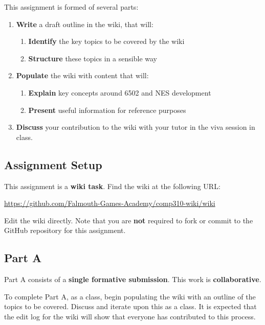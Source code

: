 \documentclass{../../fal_assignment}
\begin{document}
This assignment is formed of several parts:

\begin{enumerate}[label=(\Alph*)]
    \item \textbf{Write} a draft outline in the wiki, that will:
    	\begin{enumerate}[label=(\roman*)]
    		\item \textbf{Identify} the key topics to be covered by the wiki
    		\item \textbf{Structure} these topics in a sensible way
    	\end{enumerate}
    \item \textbf{Populate} the wiki with content that will:
    	\begin{enumerate}[label=(\roman*)]
    		\item \textbf{Explain} key concepts around 6502 and NES development
    		\item \textbf{Present} useful information for reference purposes
    	\end{enumerate}
    \item \textbf{Discuss} your contribution to the wiki with your tutor in the viva session in class.
\end{enumerate}

\subsection*{Assignment Setup}

This assignment is a \textbf{wiki task}. Find the wiki at the following URL:

\indent \url{https://github.com/Falmouth-Games-Academy/comp310-wiki/wiki}

Edit the wiki directly. Note that you are \textbf{not} required to fork or commit to the GitHub repository
for this assignment.

\subsection*{Part A}

Part A consists of a \textbf{single formative submission}. This work is \textbf{collaborative}.

To complete Part A, as a class, begin populating the wiki with an outline of the topics to be covered.
Discuss and iterate upon this as a class.
It is expected that the edit log for the wiki will show that everyone has contributed to this process.
\end{document}
